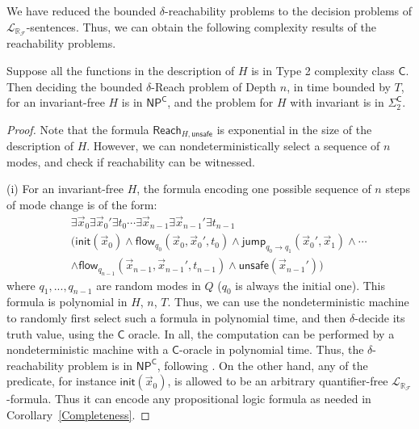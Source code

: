 \documentclass[envcountsect]{llncs}
\newcommand{\flow}{\mathsf{flow}}
\newcommand{\jump}{\mathsf{jump}}
\newcommand{\init}{\mathsf{init}}
\newcommand{\reach}{\mathsf{Reach}}
\newcommand{\unsafe}{\mathsf{unsafe}}
\newcommand{\np}{\mathsf{NP}}
\newcommand{\lrf}{\mathcal{L}_{\mathbb{R}_{\mathcal{F}}}}
\begin{document}
We have reduced the bounded $\delta$-reachability problems to the decision problems of $\lrf$-sentences. Thus, we can obtain the following complexity results of the reachability problems. 


\begin{theorem}
Suppose all the functions in the description of $H$ is in Type 2 complexity class $\mathsf{C}$. Then deciding the bounded $\delta$-Reach problem of Depth $n$, in time bounded by $T$, for an invariant-free $H$ is in $\np^{\mathsf{C}}$, and the problem for $H$ with invariant is in $\Sigma_2^{\mathsf{C}}$. 
\end{theorem}

\begin{proof}
Note that the formula $\reach_{H,\unsafe}$ is exponential in the size of the description of $H$. However, we can nondeterministically select a sequence of $n$ modes, and check if reachability can be witnessed.

(i) For an invariant-free $H$, the formula encoding one possible sequence of $n$ steps of mode change is of the form:
\begin{eqnarray*}
& &\exists \vec x_0 \exists \vec x_0'\exists t_0\cdots \exists \vec x_{n-1}\exists\vec x_{n-1}'\exists t_{n-1}\\
& &\Big(\init(\vec x_0)\wedge \flow_{q_0}(\vec x_0, \vec x_0', t_0)\wedge \jump_{q_0\rightarrow q_1}(\vec x_0', \vec x_1)\wedge \cdots\\
& &\wedge \flow_{q_{n-1}}(\vec x_{n-1}, \vec x_{n-1}', t_{n-1}) \wedge \unsafe(\vec x_{n-1}')\Big)
\end{eqnarray*}
where $q_1,...,q_{n-1}$ are random modes in $Q$ ($q_0$ is always the initial one). This formula is polynomial in $H$, $n$, $T$. Thus, we can use the nondeterministic machine to randomly first select such a formula in polynomial time, and then $\delta$-decide its truth value, using the $\mathsf{C}$ oracle. In all, the computation can be performed by a nondeterministic machine with a $\mathsf{C}$-oracle in polynomial time. Thus, the $\delta$-reachability problem is in $\mathsf{NP^C}$, following . On the other hand, any of the predicate, for instance $\init(\vec x_0)$, is allowed to be an arbitrary quantifier-free $\lrf$-formula. Thus it can encode any propositional logic formula as needed in Corollary~\ref{Completeness}.


\end{proof}
\end{document}
